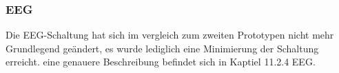 \subsubsection{EEG} \label{eeg-subsubsec}

Die EEG-Schaltung hat sich im vergleich zum zweiten Prototypen nicht mehr Grundlegend geändert, es wurde lediglich eine Minimierung der Schaltung erreicht. eine genauere Beschreibung befindet sich in Kaptiel 11.2.4 EEG.



